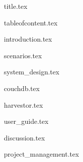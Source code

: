 \documentclass[a4paper, 11pt]{article}
\begin{document}
\thispagestyle{empty}
\thispagestyle{empty}

{title.tex}

{tableofcontent.tex}

\setcounter{page}{1}

{introduction.tex}

{scenarios.tex}

{system_design.tex}

{couchdb.tex}

{harvestor.tex}

{user_guide.tex}

{discussion.tex}

{project_management.tex}

\newpage
\printbibliography
 
\end{document}
